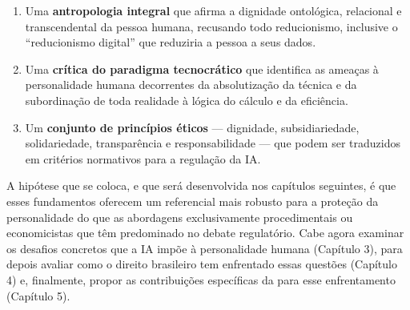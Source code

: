 \begin{enumerate}
    \item Uma \textbf{antropologia integral} que afirma a dignidade ontológica, relacional e transcendental da pessoa humana, recusando todo reducionismo, inclusive o ``reducionismo digital'' que reduziria a pessoa a seus dados.
    \item Uma \textbf{crítica do paradigma tecnocrático} que identifica as ameaças à personalidade humana decorrentes da absolutização da técnica e da subordinação de toda realidade à lógica do cálculo e da eficiência.
    \item Um \textbf{conjunto de princípios éticos} --- dignidade, subsidiariedade, solidariedade, transparência e responsabilidade --- que podem ser traduzidos em critérios normativos para a regulação da IA.
\end{enumerate}

A hipótese que se coloca, e que será desenvolvida nos capítulos seguintes, é que esses fundamentos oferecem um referencial mais robusto para a proteção da personalidade do que as abordagens exclusivamente procedimentais ou economicistas que têm predominado no debate regulatório. Cabe agora examinar os desafios concretos que a IA impõe à personalidade humana (Capítulo 3), para depois avaliar como o direito brasileiro tem enfrentado essas questões (Capítulo 4) e, finalmente, propor as contribuições específicas da \MH{} para esse enfrentamento (Capítulo 5).
